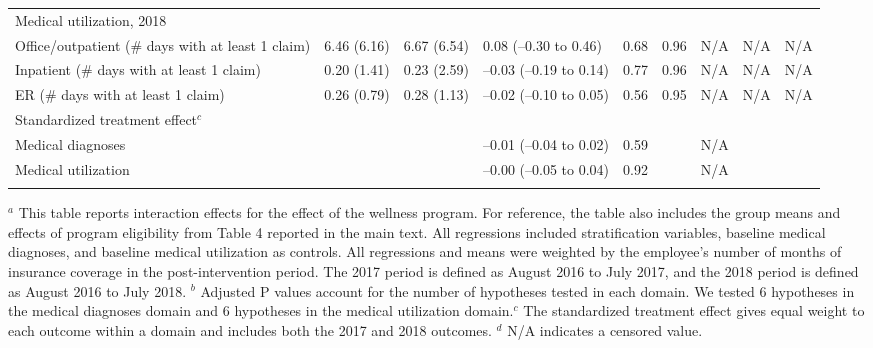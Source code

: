 \documentclass{article}
\begin{document}
\begin{landscape}
\begin{table}[tbp]
{\begin{tabularx}{\linewidth}{lCClCClCC}
Medical utilization, 2018&&&&&&&& \tabularnewline
\hspace{1em} Office/outpatient (\# days with at least 1 claim)&6.46  (6.16)&6.67  (6.54)&0.08 (--0.30 to 0.46)&0.68&0.96&N/A &N/A&N/A \tabularnewline
\hspace{1em} Inpatient (\# days with at least 1 claim)&0.20  (1.41)&0.23  (2.59)&--0.03 (--0.19 to 0.14)&0.77&0.96&N/A &N/A&N/A \tabularnewline
\hspace{1em} ER (\# days with at least 1 claim)&0.26  (0.79)&0.28  (1.13)&--0.02 (--0.10 to 0.05)&0.56&0.95&N/A &N/A&N/A \tabularnewline
Standardized treatment effect$^{c}$&&&&&&&& \tabularnewline
\hspace{1em} Medical diagnoses&&&--0.01 (--0.04 to 0.02)&0.59&&N/A && \tabularnewline
\hspace{1em} Medical utilization&&&--0.00 (--0.05 to 0.04)&0.92&&N/A && \tabularnewline
\bottomrule \addlinespace[\belowrulesep]

\end{tabularx}
\begin{flushleft}
\tiny $^{a}$ This table reports interaction effects for the effect of the wellness program. For reference, the table also includes the group means and effects of program eligibility from Table 4 reported in the main text. All regressions included stratification variables, baseline medical diagnoses, and baseline medical utilization as controls. All regressions and means were weighted by the employee's number of months of insurance coverage in the post-intervention period. The 2017 period is defined as August 2016 to July 2017, and the 2018 period is defined as August 2016 to July 2018. \newline $^{b}$ Adjusted P values account for the number of hypotheses tested in each domain. We tested 6 hypotheses in the medical diagnoses domain and 6 hypotheses in the medical utilization domain.\newline $^{c}$ The standardized treatment effect gives equal weight to each outcome within a domain and includes both the 2017 and 2018 outcomes. \newline $^{d}$ N/A indicates a censored value.
\end{flushleft}
}
\end{table}
\end{landscape}
\end{document}
